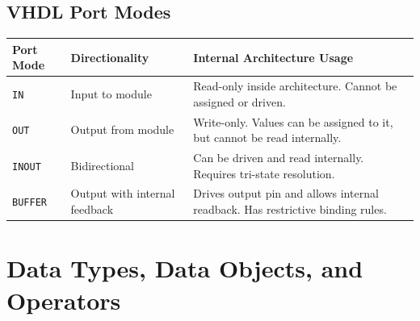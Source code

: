 \documentclass[12pt,a4paper]{article}
\begin{document}
\subsection{VHDL Port Modes}
\par\vspace{6pt}\noindent
\begingroup
\setlength{\tabcolsep}{3.5pt}
\setlength{\extrarowheight}{3pt}
\begin{tabularx}{\linewidth}{|B{2.2cm}|B{3.2cm}|Y|}
\hline
\textbf{Port Mode} & \textbf{Directionality} & \textbf{Internal Architecture Usage} \\
\hline
\texttt{IN} & Input to module & Read-only inside architecture. Cannot be assigned or driven. \\
\hline
\texttt{OUT} & Output from module & Write-only. Values can be assigned to it, but cannot be read internally. \\
\hline
\texttt{INOUT} & Bidirectional & Can be driven and read internally. Requires tri-state resolution. \\
\hline
\texttt{BUFFER} & Output with internal feedback & Drives output pin and allows internal readback. Has restrictive binding rules. \\
\hline
\end{tabularx}
\endgroup

\section{Data Types, Data Objects, and Operators}
\end{document}
